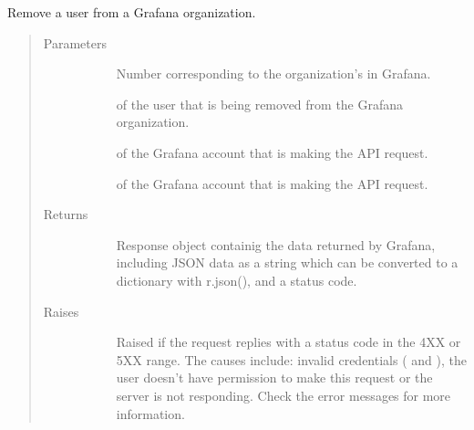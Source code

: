 \documentclass[letterpaper,10pt,english]{sphinxmanual}
\begin{document}

\begin{fulllineitems}
\label{\detokenize{grafanaAPI:grafanaAPI.removeFromOrg}}
Remove a user from a Grafana organization.
\begin{quote}\begin{description}
\item[{Parameters}] \leavevmode\begin{description}
\item[{}] \leavevmode{[}\sphinxtitleref{int}{]}
Number corresponding to the organization’s  in Grafana.

\item[{}] \leavevmode{[}\sphinxtitleref{int}{]}
 of the user that is being removed from the Grafana organization.

\item[{}] \leavevmode{[}\sphinxtitleref{str}{]}
 of the Grafana account that is making the API request.

\item[{}] \leavevmode{[}\sphinxtitleref{str}{]}
 of the Grafana account that is making the API request.

\end{description}

\item[{Returns}] \leavevmode\begin{description}
\item[{}] \leavevmode{[}\sphinxtitleref{requests.Response}{]}
Response object containig the data returned by Grafana, including JSON data
as a string which can be converted to a dictionary with r.json(), and a
status code.

\end{description}

\item[{Raises}] \leavevmode\begin{description}
\item[{}] \leavevmode
Raised if the request replies with a status code in the 4XX or 5XX range.
The causes include: invalid credentials ( and ), the user
doesn’t have permission to make this request or the server is not
responding. Check the error messages for more information.


\end{description}
\end{description}
\end{quote}
\end{fulllineitems}
\end{document}
